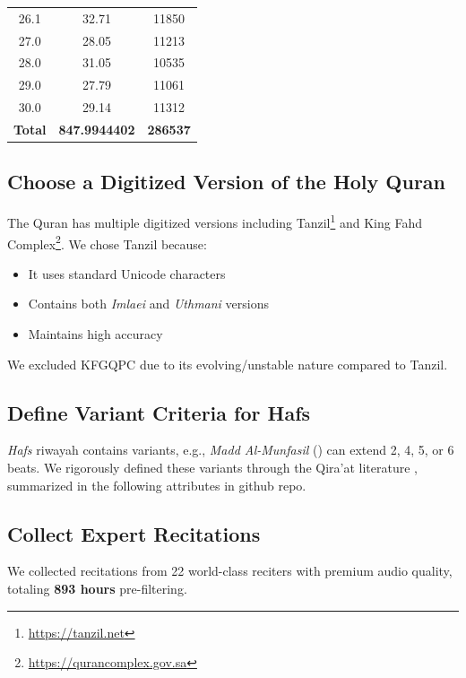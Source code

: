 \begin{table}[t]
\begin{tabular}{ccc}
		26.1               & 32.71                & 11850           \\
		27.0               & 28.05                & 11213           \\
		28.0               & 31.05                & 10535           \\
		29.0               & 27.79                & 11061           \\
		30.0               & 29.14                & 11312           \\
		\hline
		\textbf{Total}     & \textbf{847.9944402} & \textbf{286537} \\
		\hline
	\end{tabular}
\end{table}

\subsection{Choose a Digitized Version of the Holy Quran}
The Quran has multiple digitized versions including Tanzil\footnote{\url{https://tanzil.net}} and King Fahd Complex\footnote{\url{https://qurancomplex.gov.sa}}. We chose Tanzil because:
\begin{itemize}
	\item It uses standard Unicode characters
	\item Contains both \textit{Imlaei} and \textit{Uthmani} versions
	\item Maintains high accuracy
\end{itemize}
We excluded KFGQPC due to its evolving/unstable nature compared to Tanzil.

\subsection{Define Variant Criteria for Hafs}
\textit{Hafs} riwayah contains variants, e.g., \textit{Madd Al-Munfasil} () can extend 2, 4, 5, or 6 beats. We rigorously defined these variants through the Qira'at literature \cite{al-dabbaa}, summarized in the following attributes in github repo.


\subsection{Collect Expert Recitations}
We collected recitations from 22 world-class reciters with premium audio quality, totaling \textbf{893 hours} pre-filtering.

